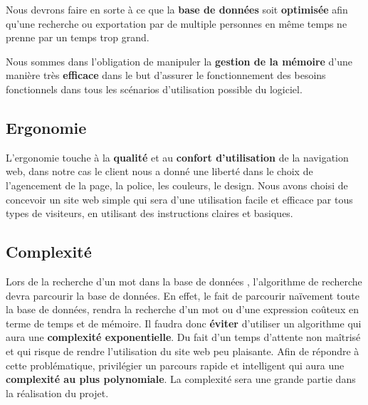 {Nous devrons faire en sorte à ce que la \textbf{base de données} soit \textbf{optimisée} afin qu'une recherche ou exportation par de multiple personnes en même temps ne prenne par un temps trop grand.\par}
Nous sommes dans l'obligation de manipuler la \textbf{gestion de la mémoire} d'une manière très \textbf{efficace} dans le but d'assurer le fonctionnement des besoins fonctionnels dans tous les scénarios d'utilisation possible du logiciel. 

\subsection{Ergonomie}
L’ergonomie touche à la \textbf{qualité} et au \textbf{confort d’utilisation} de la navigation web, dans notre cas le client nous a donné une liberté dans le choix de l'agencement de la page, la police, les couleurs, le design. Nous avons choisi de concevoir un site web simple qui sera d'une utilisation facile et efficace par tous types de visiteurs, en utilisant des instructions claires et basiques.

\subsection{Complexité}
Lors de la recherche d'un mot dans la base de données , l'algorithme de recherche devra parcourir la base de données. En effet, le fait de parcourir naïvement toute la base de données, rendra la recherche d'un mot ou d'une expression coûteux en terme de temps et de mémoire. Il faudra donc \textbf{éviter} d'utiliser un algorithme qui aura une \textbf{complexité exponentielle}. Du fait d'un temps d'attente non maîtrisé et qui risque de rendre l'utilisation du site web peu plaisante. Afin de répondre à cette problématique, privilégier un parcours rapide et intelligent qui aura une \textbf{complexité au plus polynomiale}.
La complexité sera une grande partie dans la réalisation du projet. 

